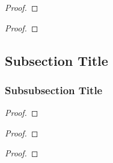 \begin{thrm}
    \lipsum[1]
\end{thrm}

\begin{proof}
    \lipsum[1]
\end{proof}

\begin{coro}
    \lipsum[1]
\end{coro}

\begin{proof}
    \lipsum[1]
\end{proof}

\subsection{Subsection Title}


\begin{defn}
    \lipsum[1]
\end{defn}

\begin{exmp}
    \lipsum[1]
\end{exmp}

\begin{rmrk}
    \lipsum[1]
\end{rmrk}

\subsubsection{Subsubsection Title}

\begin{lemm}
    \lipsum[1]
\end{lemm}

\begin{proof}
    \lipsum[1]
\end{proof}

\begin{thrm}
    \lipsum[1]
\end{thrm}

\begin{proof}
    \lipsum[1]
\end{proof}

\begin{coro}
    \lipsum[1]
\end{coro}

\begin{proof}
    \lipsum[1]
\end{proof}

